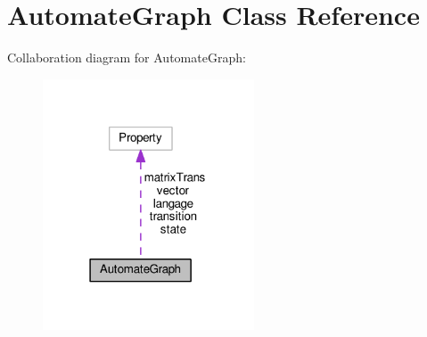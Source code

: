 \hypertarget{class_automate_graph}{}\section{Automate\+Graph Class Reference}
\label{class_automate_graph}


Collaboration diagram for Automate\+Graph\+:
\nopagebreak
\begin{figure}[H]
\begin{center}
\leavevmode
\includegraphics[width=178pt]{class_automate_graph__coll__graph}
\end{center}
\end{figure}
